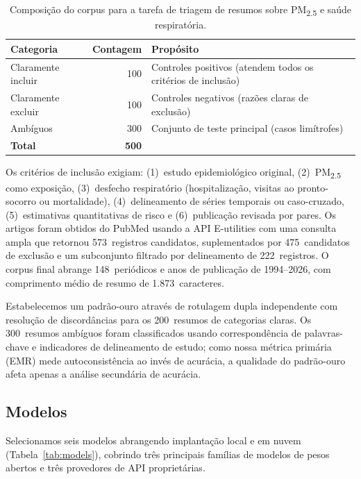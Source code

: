 \documentclass[12pt, a4paper]{article}
\begin{document}
\begin{table}[H]
\centering
\caption{Composição do corpus para a tarefa de triagem de resumos sobre PM\textsubscript{2.5} e saúde respiratória.}
\label{tab:corpus}
\begin{tabular}{lrl}
\toprule
\textbf{Categoria} & \textbf{Contagem} & \textbf{Propósito} \\
\midrule
Claramente incluir    & 100   & Controles positivos (atendem todos os critérios de inclusão) \\
Claramente excluir    & 100   & Controles negativos (razões claras de exclusão) \\
Ambíguos              & 300   & Conjunto de teste principal (casos limítrofes) \\
\midrule
\textbf{Total}        & \textbf{500} & \\
\bottomrule
\end{tabular}
\end{table}

\noindent Os critérios de inclusão exigiam: (1)~estudo epidemiológico original, (2)~PM\textsubscript{2.5} como exposição, (3)~desfecho respiratório (hospitalização, visitas ao pronto-socorro ou mortalidade), (4)~delineamento de séries temporais ou caso-cruzado, (5)~estimativas quantitativas de risco e (6)~publicação revisada por pares.
Os artigos foram obtidos do PubMed usando a API E-utilities com uma consulta ampla que retornou 573~registros candidatos, suplementados por 475~candidatos de exclusão e um subconjunto filtrado por delineamento de 222~registros.
O corpus final abrange 148~periódicos e anos de publicação de 1994--2026, com comprimento médio de resumo de 1.873~caracteres.

Estabelecemos um padrão-ouro através de rotulagem dupla independente com resolução de discordâncias para os 200~resumos de categorias claras.
Os 300~resumos ambíguos foram classificados usando correspondência de palavras-chave e indicadores de delineamento de estudo; como nossa métrica primária (EMR) mede autoconsistência ao invés de acurácia, a qualidade do padrão-ouro afeta apenas a análise secundária de acurácia.

\subsection{Modelos}

Selecionamos seis modelos abrangendo implantação local e em nuvem (Tabela~\ref{tab:models}), cobrindo três principais famílias de modelos de pesos abertos e três provedores de API proprietárias.
\end{document}
